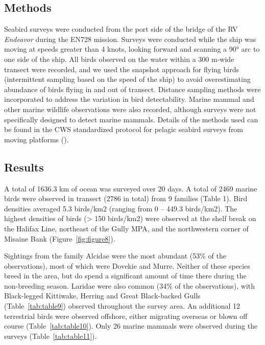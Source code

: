 \documentclass[12pt]{article}\usepackage[]{graphicx}\usepackage[]{color}
\begin{document}
\subsection{Methods}\label{methods}

Seabird surveys were conducted from the port side of the bridge of the RV \emph{Endeavor} during the EN728 mission. Surveys were conducted while the ship was moving at speeds greater than 4 knots, looking forward and scanning a 90° arc to one side of the ship. All birds observed on the water within a 300 m-wide transect were recorded, and we used the snapshot approach for flying birds (intermittent sampling based on the speed of the ship) to avoid overestimating abundance of birds flying in and out of transect. Distance sampling methods were incorporated to address the variation in bird detectability. Marine mammal and other marine wildlife observations were also recorded, although surveys were not specifically designed to detect marine mammals. Details of the methods used can be found in the CWS standardized protocol for pelagic seabird surveys from moving platforms ().

\subsection{Results}\label{results}

A total of 1636.3 km of ocean was surveyed over 20 days. A total of 2469 marine birds were observed in transect (2786 in total) from 9 families (Table 1). Bird densities averaged 5.3 birds/km2 (ranging from 0 -- 449.3 birds/km2). The highest densities of birds (\textgreater{} 150 birds/km2) were observed at the shelf break on the Halifax Line, northeast of the Gully MPA, and the northwestern corner of Misaine Bank (Figure~\ref{fig:figure8}).

Sightings from the family Alcidae were the most abundant (53\% of the observations), most of which were Dovekie and Murre. Neither of these species breed in the area, but do spend a significant amount of time there during the non-breeding season. Laridae were also common (34\% of the observations), with Black-legged Kittiwake, Herring and Great Black-backed Gulls (Table~\ref{tab:table9}) observed throughout the survey area. An additional 12 terrestrial birds were observed offshore, either migrating overseas or blown off course (Table~\ref{tab:table10}). Only 26 marine mammals were observed during the surveys (Table~\ref{tab:table11}).
\end{document}
